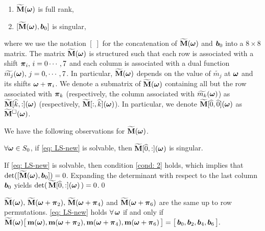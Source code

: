\begin{enumerate}[leftmargin=.5in]
\item[\mylabel{cond: 1}{(\ref{sec: solve-quincunx}.i)}] $\widetilde{\mathbf{M}}(\boldsymbol{\omega})$ is full rank,
\item[\mylabel{cond: 2}{(\ref{sec: solve-quincunx}.ii)}] $[\widetilde{\mathbf{M}}(\boldsymbol{\omega}), \boldsymbol{b}_0]$ is singular,
\end{enumerate}
where we use the notation $[\;]$ for the concatenation of $\widetilde{\mathbf{M}}(\boldsymbol{\omega})$ and $\boldsymbol{b}_0$ into a $8\times 8$ matrix. %
The matrix $\widetilde{\mathbf{M}}(\boldsymbol{\omega})$ is structured such that each row is associated with a shift $\boldsymbol{\pi}_i,\,i=0\cdots,7$ and each column is associated with a dual function $\widetilde{m_{j}}(\boldsymbol{\omega}),\,j=0,\cdots,7$. In particular, $\widetilde{\mathbf{M}}(\boldsymbol{\omega})$ depends on the value of $\widetilde{m_j}$ at $\boldsymbol{\omega}$ and its shifts $\boldsymbol{\omega}+\boldsymbol{\pi}_i$. We denote a submatrix of $\widetilde{\mathbf{M}}(\boldsymbol{\omega})$ containing all but the row associated with $\boldsymbol{\pi}_k$ (respectively, the column associated with $\widetilde{m_{k}}(\boldsymbol{\omega})$) as $\widetilde{\mathbf{M}}[\widehat{k},:](\boldsymbol{\omega})$ (respectively, $\widetilde{\mathbf{M}}[:,\widehat{k}](\boldsymbol{\omega})$).
In particular, we denote $\widetilde{\mathbf{M}}[\widehat{0},\widehat{0}](\boldsymbol{\omega})$ as $\widetilde{\mathbf{M}}^{\Box}(\boldsymbol{\omega})$.

We have the following observations for $\widetilde{\mathbf{M}}(\boldsymbol{\omega})$.
\begin{lemma}\label{lem: subM-singular}
 $\forall \boldsymbol{\omega}\in S_0$, if \eqref{eq: LS-new} is solvable, then $\widetilde{\mathbf{M}}[\widehat{0},:](\boldsymbol{\omega})$ is singular.
\end{lemma}
If \eqref{eq: LS-new} is solvable, then condition \ref{cond: 2} holds, which implies that $\det([\widetilde{\mathbf{M}}(\boldsymbol{\omega}),\boldsymbol{b}_0]) = 0$. Expanding the determinant with respect to the last column $\boldsymbol{b}_0$ yields $\det(\,\widetilde{\mathbf{M}}[\widehat{0},:](\boldsymbol{\omega})\,) = 0$.\qed

\begin{lemma}\label{lem: M-symmetry}
$\widetilde{\mathbf{M}}(\boldsymbol{\omega}),\,\widetilde{\mathbf{M}}(\boldsymbol{\omega}+\boldsymbol{\pi}_2),\,\widetilde{\mathbf{M}}(\boldsymbol{\omega}+\boldsymbol{\pi}_4)$ and $\widetilde{\mathbf{M}}(\boldsymbol{\omega}+\boldsymbol{\pi}_6)$ are the same up to row permutations. \eqref{eq: LS-new} holds $\forall \, \boldsymbol{\omega}$ if and only if 
$\widetilde{\mathbf{M}}(\boldsymbol{\omega}) \big[\,\mathbf{m}(\boldsymbol{\omega}),\mathbf{m}(\boldsymbol{\omega}+\boldsymbol{\pi}_2),\mathbf{m}(\boldsymbol{\omega}+\boldsymbol{\pi}_4),\mathbf{m}(\boldsymbol{\omega}+\boldsymbol{\pi}_6)\,\big] = \big[\,\boldsymbol{b}_0,\boldsymbol{b}_2,\boldsymbol{b}_4,\boldsymbol{b}_6\,\big].$
\end{lemma}

